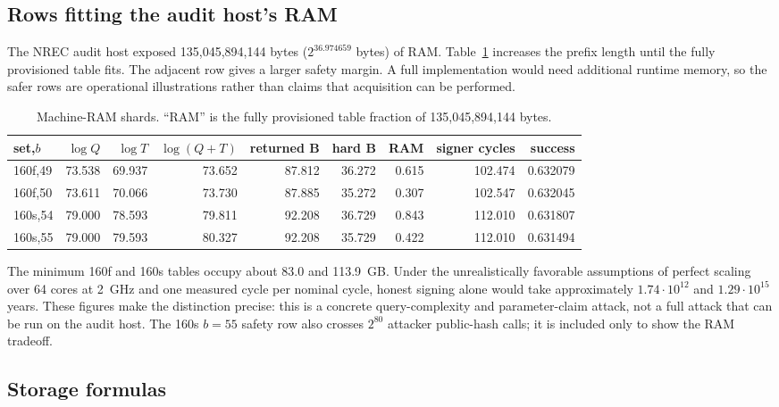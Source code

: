 \documentclass[11pt,a4paper]{article}
\begin{document}
\subsection{Rows fitting the audit host's RAM}

The NREC audit host exposed 135,045,894,144 bytes
($2^{36.974659}$ bytes) of RAM.  Table~\ref{tab:host} increases the prefix
length until the fully provisioned table fits.  The adjacent row gives a
larger safety margin.  A full implementation would need additional runtime
memory, so the safer rows are operational illustrations rather than claims
that acquisition can be performed.

\begin{table}[ht]
\centering
\small
\caption{Machine-RAM shards.  ``RAM'' is the fully provisioned table fraction
of 135,045,894,144 bytes.}
\label{tab:host}
\setlength{\tabcolsep}{4pt}
\begin{tabular}{lrrrrrrrr}
\toprule
set,$b$ & $\log Q$ & $\log T$ & $\log(Q+T)$ & returned B & hard B & RAM & signer cycles & success\\
\midrule
160f,49&73.538&69.937&73.652&87.812&36.272&0.615&102.474&0.632079\\
160f,50&73.611&70.066&73.730&87.885&35.272&0.307&102.547&0.632045\\
160s,54&79.000&78.593&79.811&92.208&36.729&0.843&112.010&0.631807\\
160s,55&79.000&79.593&80.327&92.208&35.729&0.422&112.010&0.631494\\
\bottomrule
\end{tabular}
\end{table}

The minimum 160f and 160s tables occupy about 83.0 and 113.9~GB.  Under the
unrealistically favorable assumptions of perfect scaling over 64 cores at
2~GHz and one measured cycle per nominal cycle, honest signing alone would
take approximately $1.74\cdot10^{12}$ and $1.29\cdot10^{15}$ years.  These
figures make the distinction precise: this is a concrete query-complexity and
parameter-claim attack, not a full attack that can be run on the audit host.
The 160s $b=55$ safety row also crosses $2^{80}$ attacker public-hash calls;
it is included only to show the RAM tradeoff.

\subsection{Storage formulas}
\end{document}
